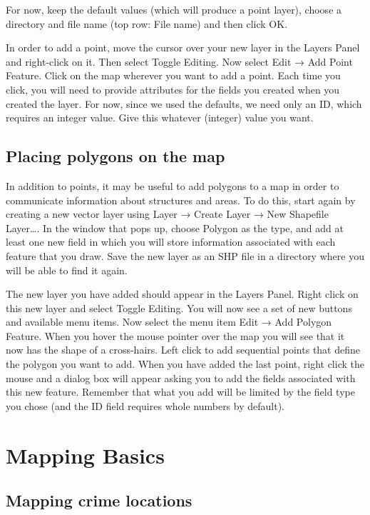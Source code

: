 \documentclass[]{book}
\begin{document}
For now, keep the default values (which will produce a point layer), choose a directory and file name (top row: File name) and then click OK.

In order to add a point, move the cursor over your new layer in the Layers Panel and right-click on it. Then select Toggle Editing. Now select Edit → Add Point Feature. Click on the map wherever you want to add a point. Each time you click, you will need to provide attributes for the fields you created when you created the layer. For now, since we used the defaults, we need only an ID, which requires an integer value. Give this whatever (integer) value you want.

\hypertarget{placing-polygons-on-the-map}{%
\section{Placing polygons on the map}\label{placing-polygons-on-the-map}}

In addition to points, it may be useful to add polygons to a map in order to communicate information about structures and areas. To do this, start again by creating a new vector layer using Layer → Create Layer → New Shapefile Layer\ldots{}. In the window that pops up, choose Polygon as the type, and add at least one new field in which you will store information associated with each feature that you draw. Save the new layer as an SHP file in a directory where you will be able to find it again.

The new layer you have added should appear in the Layers Panel. Right click on this new layer and select Toggle Editing. You will now see a set of new buttons and available menu items. Now select the menu item Edit → Add Polygon Feature. When you hover the mouse pointer over the map you will see that it now has the shape of a cross-hairs. Left click to add sequential points that define the polygon you want to add. When you have added the last point, right click the mouse and a dialog box will appear asking you to add the fields associated with this new feature. Remember that what you add will be limited by the field type you chose (and the ID field requires whole numbers by default).

\hypertarget{mapping-basics}{%
\chapter{Mapping Basics}\label{mapping-basics}}

\hypertarget{mapping-crime-locations}{%
\section{Mapping crime locations}\label{mapping-crime-locations}}
\end{document}
